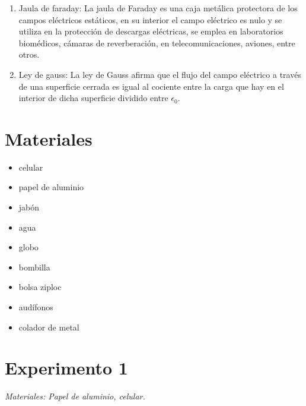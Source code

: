 \documentclass[]{article}
\begin{document}
\begin{multicols*}{2}
\begin{enumerate}
    \item Jaula de faraday: La jaula de Faraday es una caja metálica protectora de los campos eléctricos estáticos, en su interior el campo eléctrico es nulo y se utiliza en la protección de descargas eléctricas, se emplea en laboratorios biomédicos, cámaras de reverberación, en telecomunicaciones, aviones, entre otros.
    
    \item Ley de gauss: La ley de Gauss afirma que el flujo del campo eléctrico a través de una superficie cerrada es igual al cociente entre la carga que hay en el interior de dicha superficie dividido entre $\epsilon_0$.
\end{enumerate}




\section*{Materiales}

\begin{multicols*}{2}
\begin{itemize}
    \item celular
    \item papel de aluminio
    \item jabón
    \item agua
    \item globo
    \item bombilla
    \item bolsa ziploc
    \item audífonos
    \item colador de metal 
\end{itemize}
\end{multicols*}




\section*{Experimento 1}
\textit{Materiales: Papel de aluminio, celular.}


\end{multicols*}
\end{document}
